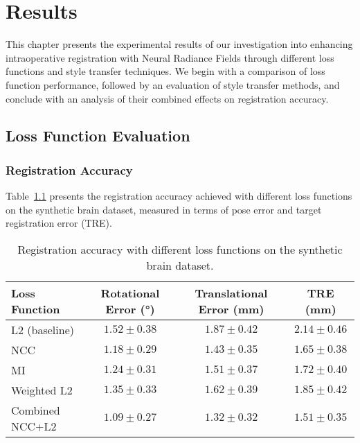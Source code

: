 
\chapter{Results}\label{chapter:results}

This chapter presents the experimental results of our investigation into enhancing intraoperative registration with Neural Radiance Fields through different loss functions and style transfer techniques. We begin with a comparison of loss function performance, followed by an evaluation of style transfer methods, and conclude with an analysis of their combined effects on registration accuracy.

\section{Loss Function Evaluation}

\subsection{Registration Accuracy}

Table~\ref{tab:loss_accuracy} presents the registration accuracy achieved with different loss functions on the synthetic brain dataset, measured in terms of pose error and target registration error (TRE).

\begin{table}[htpb]
  \caption[Registration accuracy with different loss functions]{Registration accuracy with different loss functions on the synthetic brain dataset.}\label{tab:loss_accuracy}
  \centering
  \begin{tabular}{l c c c}
    \toprule
      Loss Function & Rotational Error (°) & Translational Error (mm) & TRE (mm) \\
    \midrule
      L2 (baseline) & $1.52 \pm 0.38$ & $1.87 \pm 0.42$ & $2.14 \pm 0.46$ \\
      NCC & $1.18 \pm 0.29$ & $1.43 \pm 0.35$ & $1.65 \pm 0.38$ \\
      MI & $1.24 \pm 0.31$ & $1.51 \pm 0.37$ & $1.72 \pm 0.40$ \\
      Weighted L2 & $1.35 \pm 0.33$ & $1.62 \pm 0.39$ & $1.85 \pm 0.42$ \\
      Combined NCC+L2 & $\mathbf{1.09 \pm 0.27}$ & $\mathbf{1.32 \pm 0.32}$ & $\mathbf{1.51 \pm 0.35}$ \\
    \bottomrule
  \end{tabular}
\end{table}

